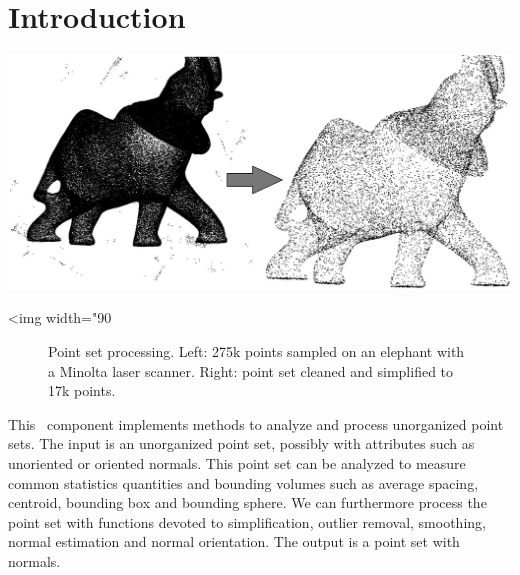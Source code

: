 \section{Introduction}

\begin{center}
    \label{Point_set_processing_3-fig-introduction}
    \begin{ccTexOnly}
        \includegraphics[width=1.0\textwidth]{Point_set_processing_3/introduction} %
    \end{ccTexOnly}
    \begin{ccHtmlOnly}
        <img width="90%
    \end{ccHtmlOnly}
    \begin{figure}[h]
        \caption{Point set processing.
                 Left: 275k points sampled on an elephant with a Minolta laser scanner.
                 Right: point set cleaned and simplified to 17k points.}
    \end{figure}
\end{center}

This \cgal\ component implements methods to analyze and process unorganized point sets.
The input is an unorganized point set, possibly with attributes such as unoriented or oriented normals.
This point set can be analyzed to measure common statistics quantities and bounding volumes such as average spacing, centroid, bounding box and bounding sphere.
We can furthermore process the point set with functions devoted to simplification, outlier removal, smoothing, normal estimation and normal orientation.
The output is a point set with normals.


